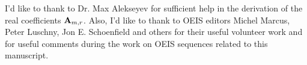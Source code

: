 I'd like to thank to Dr. Max Alekseyev for sufficient help in the derivation of the real coefficients ${\mathbf{A}} \sb{m,r}$.
Also, I'd like to thank to OEIS editors Michel Marcus, Peter Luschny, Jon E. Schoenfield and others
for their useful volunteer work and for useful comments during the work on OEIS sequences related to this manuscript.
